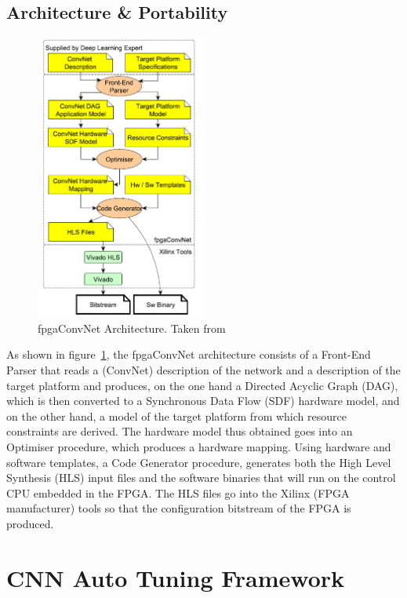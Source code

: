 \subsection{Architecture \& Portability}

\begin{figure}[!htbp]
    \centering
    \includegraphics[width=0.5\textwidth]{Figures/fpgaconvnet.png}
    \caption{fpgaConvNet Architecture. Taken from~\cite{fpgaconvnet}}
    \label{figure:fpgaconvnet}
\end{figure}

As shown in figure~\ref{figure:fpgaconvnet}, the fpgaConvNet architecture
consists of a Front-End Parser that reads a (ConvNet) description of the network
and a description of the target platform and produces, on the one hand a
Directed Acyclic Graph (DAG), which is then converted to a Synchronous Data Flow
(SDF) hardware model, and on the other hand, a model of the target platform from
which resource constraints are derived. The hardware model thus obtained goes
into an Optimiser procedure, which produces a hardware mapping. Using hardware
and software templates, a Code Generator procedure, generates both the High
Level Synthesis (HLS) input files and the software binaries that will run on the
control CPU embedded in the FPGA. The HLS files go into the Xilinx (FPGA
manufacturer) tools so that the configuration bitstream of the FPGA is produced.

\newpage
\section{CNN Auto Tuning Framework}
\label{section:autotuning}
